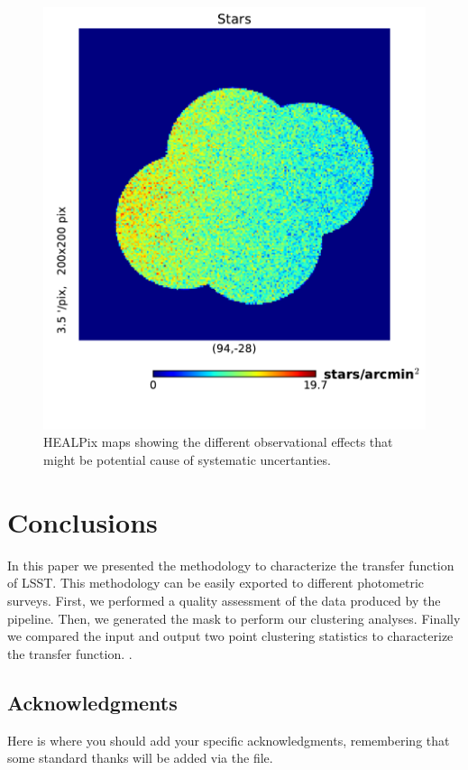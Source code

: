 \documentclass[\docopts]{\docclass}
\begin{document}
\begin{figure}
\includegraphics[width=0.9\columnwidth]{stars_map_2048.pdf}
\caption{HEALPix maps showing the different observational effects that might be potential cause of systematic uncertanties.}
\label{fig:systematic_maps}
\end{figure}


\section{Conclusions}
\label{sec:conclusions}

In this paper we presented the methodology to characterize the transfer function of LSST. This methodology can be easily exported to different photometric surveys. First, we performed a quality assessment of the data produced by the pipeline. Then, we generated the mask to perform our clustering analyses. Finally we compared the input and output two point clustering statistics to characterize the transfer function. .



\subsection*{Acknowledgments}

Here is where you should add your specific acknowledgments, remembering that some standard thanks will be added via the  file.





\end{document}
